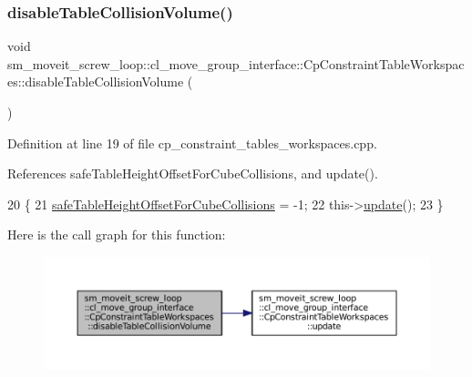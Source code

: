 \subsubsection{\texorpdfstring{disable\+Table\+Collision\+Volume()}{disableTableCollisionVolume()}}
{\footnotesize\ttfamily void sm\+\_\+moveit\+\_\+screw\+\_\+loop\+::cl\+\_\+move\+\_\+group\+\_\+interface\+::\+Cp\+Constraint\+Table\+Workspaces\+::disable\+Table\+Collision\+Volume (\begin{DoxyParamCaption}{ }\end{DoxyParamCaption})}



Definition at line 19 of file cp\+\_\+constraint\+\_\+tables\+\_\+workspaces.\+cpp.



References safe\+Table\+Height\+Offset\+For\+Cube\+Collisions, and update().


\begin{DoxyCode}
20         \{
21             \hyperlink{classsm__moveit__screw__loop_1_1cl__move__group__interface_1_1CpConstraintTableWorkspaces_aef6283c1b9bc7b0aeb7c106b6e70a055}{safeTableHeightOffsetForCubeCollisions} = -1;
22             this->\hyperlink{classsm__moveit__screw__loop_1_1cl__move__group__interface_1_1CpConstraintTableWorkspaces_a873050debbad5977c78beb93a0b6ce77}{update}();
23         \}
\end{DoxyCode}
Here is the call graph for this function\+:
\nopagebreak
\begin{figure}[H]
\begin{center}
\leavevmode
\includegraphics[width=350pt]{classsm__moveit__screw__loop_1_1cl__move__group__interface_1_1CpConstraintTableWorkspaces_a4c60d31f82a7f62afbb4540b0825c724_cgraph}
\end{center}
\end{figure}
\mbox{\label{classsm__moveit__screw__loop_1_1cl__move__group__interface_1_1CpConstraintTableWorkspaces_aaf31156acbb0c4acb0626807b92d8e3e}} 

